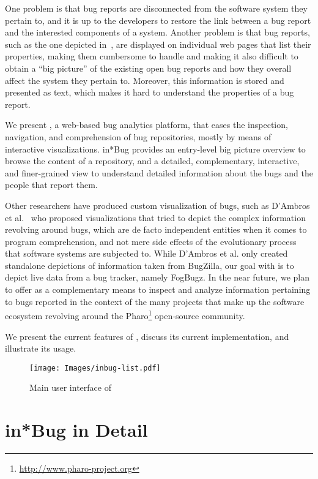 One problem is that bug reports are disconnected from the software system they pertain to, and it is up to the developers to restore the link between a bug report and the interested components of a system. Another problem is that bug reports, such as the one depicted in~, are displayed on individual web pages that list their properties, making them cumbersome to handle and making it also difficult to obtain a ``big picture'' of the existing open bug reports and how they overall affect the system they pertain to. Moreover, this information is stored and presented as text, which makes it hard to understand the properties of a bug report.

We present \ib, a web-based bug analytics platform, that eases the inspection, navigation, and comprehension of bug repositories, mostly by means of interactive visualizations. in*Bug provides an entry-level big picture overview to browse the content of a repository, and a detailed, complementary, interactive, and finer-grained view to understand detailed information about the bugs and the people that report them.

Other researchers have produced custom visualization of bugs, such as D'Ambros et al.~\cite{DAmb2007a,DAmb2007b} who proposed visualizations that tried to depict the complex information revolving around bugs, which are de facto independent entities when it comes to program comprehension, and not mere side effects of the evolutionary process that software systems are subjected to. While D'Ambros et al. only created standalone depictions of information taken from BugZilla, our goal with \ib is to depict live data from a bug tracker, namely FogBugz. In the near future, we plan to offer \ib as a complementary means to inspect and analyze information pertaining to bugs reported in the context of the many projects that make up the software ecosystem revolving around the Pharo\footnote{\url{http://www.pharo-project.org}} open-source community.

We present the current features of \ib, discuss its current implementation, and illustrate its usage. 

\begin{figure*}[ht]
\centering
\texttt{[image: Images/inbug-list.pdf]}
\caption{Main user interface of \ib}
\label{inbug}
\end{figure*}

\section{in*Bug in Detail}

